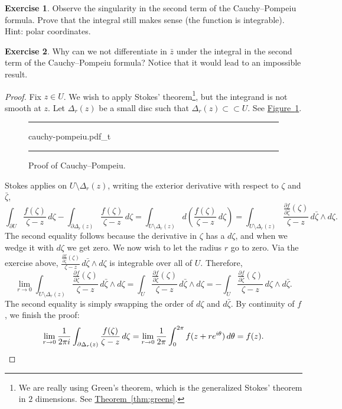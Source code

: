 \documentclass[12pt,openany]{book}
\theoremstyle{plain}
\theoremstyle{remark}
\theoremstyle{definition}
\newenvironment{exbox}{%
    \def\FrameCommand{\vrule width 1pt \relax\hspace{10pt}}%
    \MakeFramed{\advance\hsize-\width\FrameRestore}%
}{%
    \endMakeFramed
}
\newenvironment{myfig}{%
\begin{figure}[h!t]
\noindent\rule{\textwidth}{0.5pt}\vspace{12pt}\par\centering}%
{\par\noindent\rule{\textwidth}{0.5pt}
\end{figure}}
\theoremstyle{exercise}
\newtheorem{exercise}{Exercise}[section]
\theoremstyle{example}
\newcommand{\figureref}[1]{\hyperref[#1]{Figure~\ref*{#1}}}
\newcommand{\thmref}[1]{\hyperref[#1]{Theorem~\ref*{#1}}}
\begin{document}
\begin{exbox}
\begin{exercise}
Observe the singularity in the second term of the Cauchy--Pompeiu formula.
Prove that the integral still makes
sense (the function is integrable).  Hint: polar coordinates.
\end{exercise}

\begin{exercise}
Why can we not differentiate in $\bar{z}$ under the integral in the second
term of the Cauchy--Pompeiu formula?
Notice that it would lead to an impossible result.
\end{exercise}
\end{exbox}

\begin{proof}
Fix $z \in U$.  We wish to apply Stokes' theorem\footnote{%
We are really using Green's theorem, which is the generalized
Stokes' theorem in $2$ dimensions. See \thmref{thm:greens}.},
but the integrand is not smooth at $z$.
Let $\Delta_r(z)$ be a small disc such that
$\Delta_r(z) \subset
\subset U$.  See \figureref{fig:cauchy-pompeiu}.

\begin{myfig}
{cauchy-pompeiu.pdf_t}
\caption{Proof of Cauchy--Pompeiu.\label{fig:cauchy-pompeiu}}
\end{myfig}

Stokes applies on $U \setminus \Delta_r(z)$,
writing the exterior derivative with respect to $\zeta$
and $\bar{\zeta}$,
\begin{equation*}
\int_{\partial U} \frac{f(\zeta)}{\zeta-z}\,  d\zeta -
\int_{\partial \Delta_r(z)} \frac{f(\zeta)}{\zeta-z}\,  d\zeta
=
\int_{U \setminus \Delta_r(z)} d\left( \frac{f(\zeta)}{\zeta-z} \, d\zeta \right)
=
\int_{U \setminus \Delta_r(z)} \frac{\frac{\partial f}{\partial
\bar{\zeta}}(\zeta)}{\zeta-z} \, d\bar{\zeta} \wedge d\zeta .
\end{equation*}
The second equality follows because the derivative in $\zeta$
has a $d\zeta$, and when we wedge it with $d\zeta$ we get zero.
We now wish to let the radius $r$ go to zero.
Via the exercise above,
$\frac{\frac{\partial f}{\partial \bar{\zeta}}(\zeta)}{\zeta-z} \, d\bar{\zeta} \wedge d\zeta$
is integrable over all of $U$.  Therefore,
\begin{equation*}
\lim_{r \to 0}
\int_{U \setminus \Delta_r(z)} \frac{\frac{\partial f}{\partial
\bar{\zeta}}(\zeta)}{\zeta-z} \, d\bar{\zeta} \wedge d\zeta
=
\int_{U} \frac{\frac{\partial f}{\partial
\bar{\zeta}}(\zeta)}{\zeta-z} \, d\bar{\zeta} \wedge d\zeta
=
-
\int_{U} \frac{\frac{\partial f}{\partial
\bar{\zeta}}(\zeta)}{\zeta-z} \, d\zeta \wedge d\bar{\zeta} .
\end{equation*}
The second equality is simply swapping the order of $d\zeta$ and
$d\bar{\zeta}$.
By continuity of $f$, we finish the proof:
\begin{equation*}
\lim_{r \to 0}
\frac{1}{2\pi i}
\int_{\partial \Delta_r(z)} \frac{f(\zeta)}{\zeta-z}\,  d\zeta
=
\lim_{r \to 0}
\frac{1}{2\pi}
\int_0^{2\pi} f(z + r e^{i\theta})\, d\theta
=
f(z) .
\qedhere
\end{equation*}
\end{proof}
\end{document}
